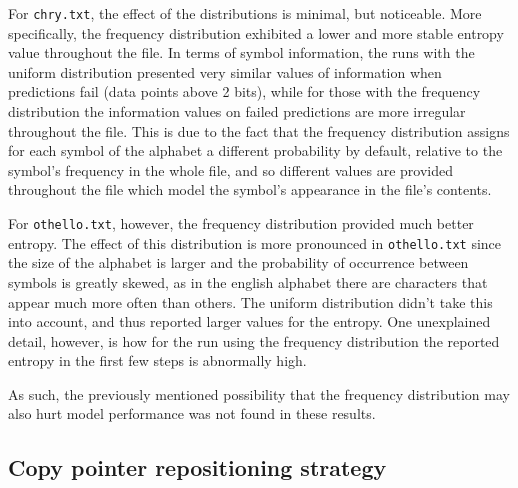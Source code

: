 \documentclass{article}
\begin{document}
For \verb|chry.txt|, the effect of the distributions is minimal, but noticeable.
More specifically, the frequency distribution exhibited a lower and more stable entropy value throughout the file.
In terms of symbol information, the runs with the uniform distribution presented very similar values of information when predictions fail (data points above 2 bits), while for those with the frequency distribution the information values on failed predictions are more irregular throughout the file.
This is due to the fact that the frequency distribution assigns for each symbol of the alphabet a different probability by default, relative to the symbol's frequency in the whole file, and so different values are provided throughout the file which model the symbol's appearance in the file's contents.

For \verb|othello.txt|, however, the frequency distribution provided much better entropy.
The effect of this distribution is more pronounced in \verb|othello.txt| since the size of the alphabet is larger and the probability of occurrence between symbols is greatly skewed, as in the english alphabet there are characters that appear much more often than others.
The uniform distribution didn't take this into account, and thus reported larger values for the entropy.
One unexplained detail, however, is how for the run using the frequency distribution the reported entropy in the first few steps is abnormally high.

As such, the previously mentioned possibility that the frequency distribution may also hurt model performance was not found in these results.

\subsection{Copy pointer repositioning strategy}
\end{document}

